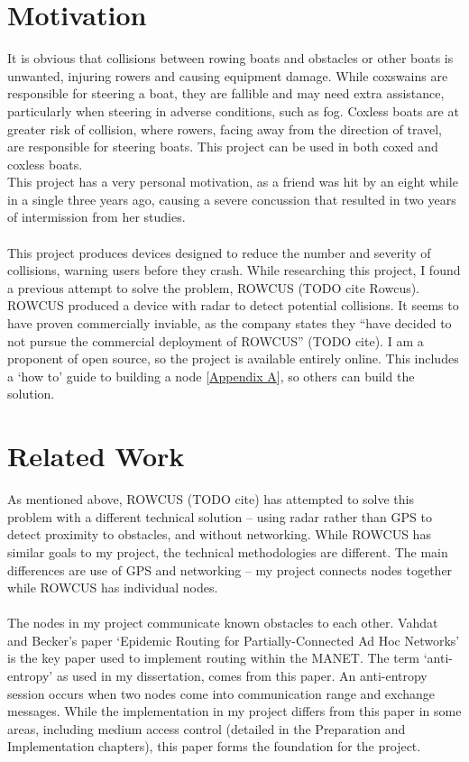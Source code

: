 \documentclass[12pt,a4paper]{report}
\begin{document}
\section{Motivation}	
It is obvious that collisions between rowing boats and obstacles or other boats is unwanted, injuring rowers and causing equipment damage. While coxswains are responsible for steering a boat, they are fallible and may need extra assistance, particularly when steering in adverse conditions, such as fog. Coxless boats are at greater risk of collision, where rowers, facing away from the direction of travel, are responsible for steering boats. This project can be used in both coxed and coxless boats. \\
This project has a very personal motivation, as a friend was hit by an eight while in a single three years ago, causing a severe concussion that resulted in two years of intermission from her studies. \\ \\
This project produces devices designed to reduce the number and severity of collisions, warning users before they crash. While researching this project, I found a previous attempt to solve the problem, ROWCUS (TODO cite Rowcus). ROWCUS produced a device with radar to detect potential collisions. It seems to have proven commercially inviable, as the company states they ``have decided to not pursue the commercial deployment of ROWCUS'' (TODO cite). I am a proponent of open source, so the project is available entirely online. This includes a `how to' guide to building a node [\hyperref[appendixA]{Appendix A}], so others can build the solution.

\section{Related Work}
As mentioned above, ROWCUS (TODO cite) has attempted to solve this problem with a different technical solution -- using radar rather than GPS to detect proximity to obstacles, and without networking. While ROWCUS has similar goals to my project, the technical methodologies are different. The main differences are use of GPS and networking -- my project connects nodes together while ROWCUS has individual nodes. \\ \\
The nodes in my project communicate known obstacles to each other. Vahdat and Becker's paper `Epidemic Routing for Partially-Connected Ad Hoc Networks' is the key paper used to implement routing within the MANET. The term `anti-entropy' as used in my dissertation, comes from this paper. An anti-entropy session occurs when two nodes come into communication range and exchange messages. While the implementation in my project differs from this paper in some areas, including medium access control (detailed in the Preparation and Implementation chapters), this paper forms the foundation for the project. 
\end{document}
